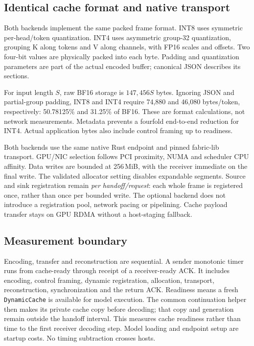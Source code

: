 \documentclass[10pt,twocolumn,letterpaper]{article}
\begin{document}
\subsection{Identical cache format and native transport}
Both backends implement the same packed frame format. INT8 uses symmetric
per-head/token quantization. INT4 uses asymmetric group-32 quantization,
grouping K along tokens and V along channels, with FP16 scales and offsets.
Two four-bit values are physically packed into each byte. Padding and
quantization parameters are part of the actual encoded buffer; canonical JSON
describes its sections.

For input length $S$, raw BF16 storage is $147{,}456S$ bytes. Ignoring JSON and
partial-group padding, INT8 and INT4 require 74,880 and 46,080 bytes/token,
respectively: 50.78125\% and 31.25\% of BF16. These are format calculations,
not network measurements. Metadata prevents a fourfold end-to-end reduction
for INT4. Actual application bytes also include control framing up to readiness.

Both backends use the same native Rust endpoint and pinned fabric-lib
transport. GPU/NIC selection follows PCI proximity, NUMA and scheduler CPU
affinity. Data writes are bounded at 256\,MiB, with the receiver immediate on
the final write. The validated allocator setting disables expandable segments.
Source and sink registration remain \emph{per handoff/request}: each whole
frame is registered once, rather than once per bounded write. The optional
backend does not introduce a registration pool, network pacing or pipelining.
Cache payload transfer stays on GPU RDMA without a host-staging fallback.

\subsection{Measurement boundary}
Encoding, transfer and reconstruction are sequential. A sender monotonic timer
runs from cache-ready through receipt of a receiver-ready ACK. It includes
encoding, control framing, dynamic registration, allocation, transport,
reconstruction, synchronization and the return ACK. Readiness means a fresh
\texttt{DynamicCache} is available for model execution. The common continuation
helper then makes its private cache copy before decoding; that copy and
generation remain outside the handoff interval. This measures cache readiness
rather than time to the first receiver decoding step. Model loading and
endpoint setup are startup costs. No timing subtraction crosses hosts.
\end{document}
